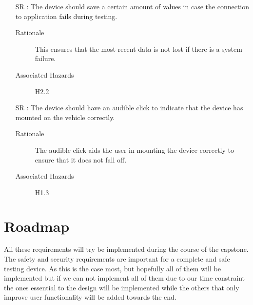 \documentclass{article}
\newcounter{reqnum} %
\begin{document}
\begin{itemize}
  \item[SR \refstepcounter{reqnum}\thereqnum:] The device should save a certain amount of values in case the connection to application fails during testing.
    \begin{description} \item[Rationale] This ensures that the most recent data is not lost if there is a system failure.   \end{description}
    \begin{description} \item[Associated Hazards] H2.2  \end{description}
  
  \item[SR \refstepcounter{reqnum}\thereqnum:] The device should have an audible click to indicate that the device has mounted on the vehicle correctly.
    \begin{description} \item[Rationale] The audible click aids the user in mounting the device correctly to ensure that it does not fall off.   \end{description}
    \begin{description} \item[Associated Hazards] H1.3  \end{description}
\end{itemize}


\section{Roadmap}

All these requirements will try be implemented during the course of the capstone. The safety and security requirements are important for a complete and safe testing device. As this  is the case most, but hopefully all of them will be implemented but if we can not implement all of them due to our time constraint the ones essential to the design will be implemented while the others that only improve user functionality will be added towards the end.
\end{document}
